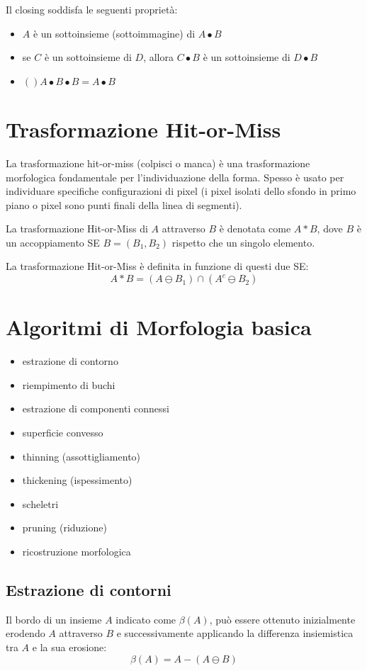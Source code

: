 Il closing soddisfa le seguenti proprietà:
\begin{itemize}
	\item $A$ è un sottoinsieme (sottoimmagine) di $A \bullet B$
	\item se $C$ è un sottoinsieme di $D$, allora $C \bullet B$ è un sottoinsieme di $D \bullet B$
	\item $()A \bullet B \bullet B = A \bullet B$
\end{itemize}

\section{Trasformazione Hit-or-Miss}
La trasformazione hit-or-miss (colpisci o manca) è una trasformazione morfologica fondamentale per l'individuazione della forma. Spesso è usato per individuare specifiche configurazioni di pixel (i pixel isolati dello sfondo in primo piano o pixel sono punti finali della linea di segmenti).

La trasformazione Hit-or-Miss di $A$ attraverso $B$ è denotata come $A *B$, dove $B$ è un accoppiamento SE $B= (B_1, B_2)$ rispetto che un singolo elemento.

La trasformazione Hit-or-Miss è definita in funzione di questi due SE:
$$
A * B = (A \ominus B_1) \cap (A^c \ominus B_2)
$$

\section{Algoritmi di Morfologia basica}
\begin{itemize}
	\item estrazione di contorno
	\item riempimento di buchi
	\item estrazione di componenti connessi
	\item superficie convesso
	\item thinning (assottigliamento)
	\item thickening (ispessimento)
	\item scheletri
	\item pruning (riduzione)
	\item ricostruzione morfologica
\end{itemize}

\subsection{Estrazione di contorni}
Il bordo di un insieme $A$ indicato come $\beta(A)$, può essere ottenuto inizialmente erodendo $A$ attraverso $B$ e successivamente applicando la differenza insiemistica tra $A$ e la sua erosione:
$$
\beta(A) = A - (A \ominus B)
$$

